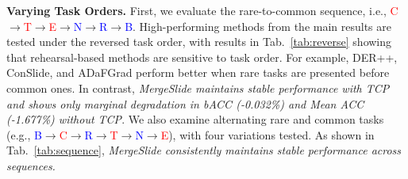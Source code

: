 \documentclass[10pt,twocolumn,letterpaper]{article}
\begin{document}

\noindent\textbf{Varying Task Orders.} First, we evaluate the rare-to-common sequence, i.e., \textcolor{red}{C}$\rightarrow$\textcolor{red}{T}$\rightarrow$\textcolor{red}{E}$\rightarrow$\textcolor{blue}{N}$\rightarrow$\textcolor{blue}{R}$\rightarrow$\textcolor{blue}{B}. High-performing methods from the main results are tested under the reversed task order, with results in Tab.~\ref{tab:reverse} showing that rehearsal-based methods are sensitive to task order. For example, DER++, ConSlide, and ADaFGrad perform better when rare tasks are presented before common ones. In contrast, \textit{MergeSlide maintains stable performance with TCP and shows only marginal degradation in bACC (-0.032\%) and Mean ACC (-1.677\%) without TCP}. We also examine alternating rare and common tasks (e.g., \textcolor{blue}{B}$\rightarrow$\textcolor{red}{C}$\rightarrow$\textcolor{blue}{R}$\rightarrow$\textcolor{red}{T}$\rightarrow$\textcolor{blue}{N}$\rightarrow$\textcolor{red}{E}), with four variations tested. As shown in Tab.~\ref{tab:sequence}, \textit{MergeSlide consistently maintains stable performance across sequences.}

\begin{table}[]
\caption{\textbf{Experiments on alternative task orders where rare and common tasks are placed alternately.} Column $\sigma$ indicates the standard deviation of average results across three metrics.}
\label{tab:sequence}
\end{table}
\end{document}
